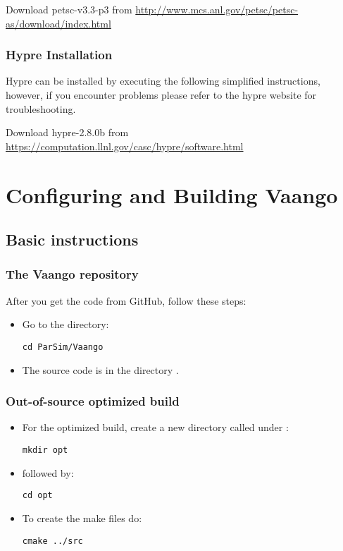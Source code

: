 \documentclass[11pt,fleqn]{book} %
\begin{document}
Download petsc-v3.3-p3 from
\url{http://www.mcs.anl.gov/petsc/petsc-as/download/index.html}

\subsection{Hypre Installation}
Hypre can be installed by executing the following simplified
instructions, however, if you encounter problems please refer to the
hypre website for troubleshooting.

Download hypre-2.8.0b from
\url{https://computation.llnl.gov/casc/hypre/software.html}

\chapter{Configuring and Building Vaango}
\section{Basic instructions}
\subsection{ The Vaango repository}
After you get the code from GitHub, follow these steps:
\begin{itemize}
  \item Go to the  directory:

\begin{lstlisting}[backgroundcolor=\color{background}]
     cd ParSim/Vaango
\end{lstlisting}

  \item  The source code is in the directory .
\end{itemize}

\subsection{ Out-of-source optimized build}
\begin{itemize}
  \item For the optimized build, create a new directory called  under :

\begin{lstlisting}[backgroundcolor=\color{background}]
    mkdir opt
\end{lstlisting}

  \item followed by:

\begin{lstlisting}[backgroundcolor=\color{background}]
    cd opt
\end{lstlisting}

  \item To create the make files do:

\begin{lstlisting}[backgroundcolor=\color{background}]
    cmake ../src
\end{lstlisting}
\end{itemize}
\end{document}
